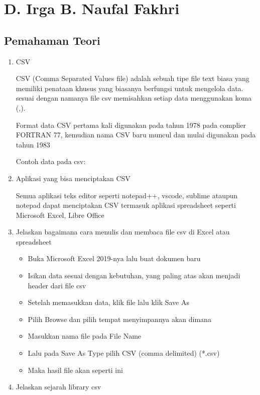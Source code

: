 \section{D. Irga B. Naufal Fakhri}
\subsection{Pemahaman Teori}
\begin{enumerate}
\item CSV

CSV (Comma Separated Values file) adalah sebuah tipe file text biasa yang memiliki penataan khusus yang biasanya berfungsi untuk mengelola data. sesuai dengan namanya file csv memisahkan setiap data menggunakan koma (,).

Format data CSV pertama kali digunakan pada tahun 1978 pada complier FORTRAN 77, kemudian nama CSV baru muncul dan mulai digunakan pada tahun 1983 

Contoh data pada csv:


\item Aplikasi yang bisa menciptakan CSV

Semua aplikasi teks editor seperti notepad++, vscode, sublime ataupun notepad dapat menciptakan CSV termasuk aplikasi spreadsheet seperti Microsoft Excel, Libre Office 

\item Jelaskan bagaimana cara menulis dan membaca file csv di Excel atau spreadsheet

\begin{itemize}
	\item Buka Microsoft Excel 2019-nya lalu buat dokumen baru
	\item Isikan data sesuai dengan kebutuhan, yang paling atas akan menjadi header dari file csv
	\item Setelah memasukkan data, klik file lalu klik Save As
	\item Pilih Browse dan pilih tempat menyimpannya akan dimana
	\item Masukkan nama file pada File Name
	\item Lalu pada Save As Type pilih CSV (comma delimited) (*.csv)
	\item Maka hasil file akan seperti ini
	
\end{itemize}

\item Jelaskan sejarah library csv


\end{enumerate}
